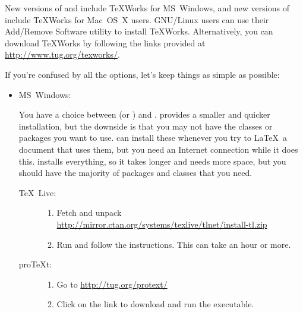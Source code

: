 New versions of  and  include TeXWorks for MS~Windows,
and new versions of  include TeXWorks for Mac~OS~X users.
GNU/Linux users can use their Add\slash Remove Software utility to 
install TeXWorks. Alternatively, you can download TeXWorks by
following the links provided at \url{http://www.tug.org/texworks/}.

\label{obj:install}%
If you're confused by all the options, let's keep
things as simple as possible:

\begin{itemize}

\item MS~Windows:

 You have a choice between  (or ) and 
 .  provides a
 smaller and quicker installation, but the downside is that you may
 not have the classes or packages you want to use.  can
 install these whenever you try to \LaTeX\ a document that uses them, 
 but you need an Internet connection while it does this. 
  installs everything, so it takes longer and needs 
 more space, but you should have the majority of packages and classes that you need.

 \begin{description}

   \item[TeX~Live:]\mbox{}

   \begin{enumerate}
    \item Fetch and unpack
     \url{http://mirror.ctan.org/systems/texlive/tlnet/install-tl.zip}

    \item Run  and follow the instructions.
     This can take an hour or more.
   \end{enumerate}

   \item[proTeXt:]\mbox{}

   \begin{enumerate}
    \item Go to \url{http://tug.org/protext/}

    \item Click on the  link
     to download and run the executable.
   \end{enumerate}


\end{description}
\end{itemize}
